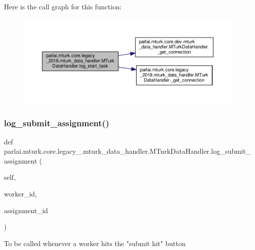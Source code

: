 Here is the call graph for this function\+:
\nopagebreak
\begin{figure}[H]
\begin{center}
\leavevmode
\includegraphics[width=350pt]{classparlai_1_1mturk_1_1core_1_1legacy__2018_1_1mturk__data__handler_1_1MTurkDataHandler_a79a42fda72f56a54462c91242fb0852b_cgraph}
\end{center}
\end{figure}
\mbox{\label{classparlai_1_1mturk_1_1core_1_1legacy__2018_1_1mturk__data__handler_1_1MTurkDataHandler_a003f7a51af6ded2072ad521bf7acf0cb}} 
\subsubsection{\texorpdfstring{log\+\_\+submit\+\_\+assignment()}{log\_submit\_assignment()}}
{\footnotesize\ttfamily def parlai.\+mturk.\+core.\+legacy\+\_.\+mturk\+\_\+data\+\_\+handler.\+M\+Turk\+Data\+Handler.\+log\+\_\+submit\+\_\+assignment (\begin{DoxyParamCaption}\item[{}]{self,  }\item[{}]{worker\+\_\+id,  }\item[{}]{assignment\+\_\+id }\end{DoxyParamCaption})}

\begin{DoxyVerb}To be called whenever a worker hits the "submit hit" button\end{DoxyVerb}
 

